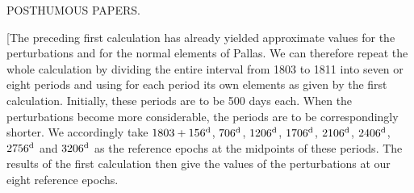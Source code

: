 \clearpage
{}
\begin{center}
{\Large POSTHUMOUS PAPERS.\par}
\par
\medskip
[DECEMBER 1810.]\par
\bigskip
[1.]
\end{center}
\begingroup
\newcommand{\IVoneSum}[2][3.1pt]{\raisebox{-#1}[0pt][0pt]{\(#2\)}}
\newcommand{\IVoneMarkedComma}{\mathord{\text{\rlap{\kern.15em\raisebox{1.15ex}{\rule{.18em}{.25pt}}},\kern.25em}}}
\newcommand{\IVoneAboveMinus}{\text{\rlap{\kern.02em\raisebox{.95ex}{\tikz[baseline=0pt,x=1em,y=1ex]{\draw[line width=.15pt](0,.15) .. controls (.07,-.08) and (.16,-.10) .. (.24,0);}}}}}
\newcommand{\IVoneTrailingStroke}{\text{\kern.02em\raisebox{.5ex}{\rule{.22em}{.25pt}}}}
\noindent\hspace*{\parindent}[The preceding first calculation has already yielded approximate values for the perturbations and for the normal elements of Pallas. We can therefore repeat the whole calculation by dividing the entire interval from 1803 to 1811 into seven or eight periods and using for each period its own elements as given by the first calculation. Initially, these periods are to be 500 days each. When the perturbations become more considerable, the periods are to be correspondingly shorter. We accordingly take \(1803+156^{\rm d}\), \(706^{\rm d}\), \(1206^{\rm d}\), \(1706^{\rm d}\), \(2106^{\rm d}\), \(2406^{\rm d}\), \(2756^{\rm d}\) and \(3206^{\rm d}\) as the reference epochs at the midpoints of these periods. The results of the first calculation then give the values of the perturbations at our eight reference epochs.
